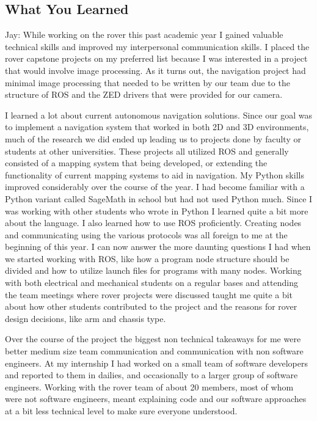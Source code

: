 \documentclass[10pt, oneside,onecolumn]{IEEEtran}
\begin{document}
\begin{titlepage}
\section{What You Learned}
Jay:
While working on the rover this past academic year I gained valuable technical skills and improved my interpersonal communication skills. I placed the rover capstone projects on my preferred list because I was interested in a project that would involve image processing. As it turns out, the navigation project had minimal image processing that needed to be written by our team due to the structure of ROS and the ZED drivers that were provided for our camera. 

I learned a lot about current autonomous navigation solutions. Since our goal was to implement a navigation system that worked in both 2D and 3D environments, much of the research we did ended up leading us to projects done by faculty or students at other universities. These projects all utilized ROS and generally consisted of a mapping system that being developed, or extending the functionality of current mapping systems to aid in navigation. My Python skills improved considerably over the course of the year. I had become familiar with a Python variant called SageMath in school but had not used Python much. Since I was working with other students who wrote in Python I learned quite a bit more about the language. I also learned how to use ROS proficiently. Creating nodes and communicating using the various protocols was all foreign to me at the beginning of this year. I can now answer the more daunting questions I had when we started working with ROS, like how a program node structure should be divided and how to utilize launch files for programs with many nodes. Working with both electrical and mechanical students on a regular bases and attending the team meetings where rover projects were discussed taught me quite a bit about how other students contributed to the project and the reasons for rover design decisions, like arm and chassis type. 

Over the course of the project the biggest non technical takeaways for me were better medium size team communication and communication with non software engineers. At my internship I had worked on a small team of software developers and reported to them in dailies, and occasionally to a larger group of software engineers. Working with the rover team of about 20 members, most of whom were not software engineers, meant explaining code and our software approaches at a bit less technical level to make sure everyone understood. 


\end{titlepage}
\end{document}
